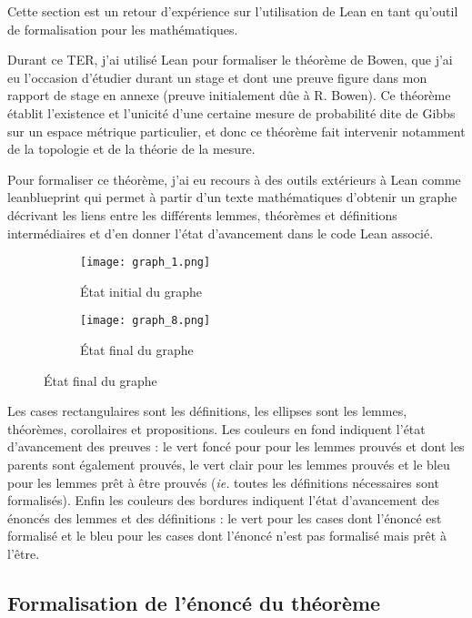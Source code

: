 \documentclass[../../rapport.tex]{subfiles}
\begin{document}
  Cette section est un retour d'expérience sur l'utilisation de Lean en tant qu'outil de formalisation pour les
  mathématiques.

  Durant ce TER, j'ai utilisé Lean pour formaliser le théorème de Bowen,
  que j'ai eu l'occasion d'étudier durant un stage et dont une preuve figure dans mon rapport de stage
  en annexe (preuve initialement dûe à R. Bowen).
  Ce théorème établit l'existence et l'unicité d'une certaine mesure de probabilité dite de Gibbs sur un espace métrique particulier,
  et donc ce théorème fait intervenir notamment de la topologie et de la théorie de la mesure.

  Pour formaliser ce théorème, j'ai eu recours à des outils extérieurs à Lean comme
  leanblueprint \cite{leanblueprint}
  qui permet à partir d'un texte mathématiques d'obtenir un graphe décrivant les liens entre les différents lemmes,
  théorèmes et définitions intermédiaires et d'en donner l'état d'avancement dans le code Lean associé.

  \begin{figure}[h]
    \centering
    \begin{subfigure}{.55\textwidth}
      \centering
      \texttt{[image: graph\_1.png]}
      \caption{État initial du graphe}
    \end{subfigure}
    \begin{subfigure}{.43\textwidth}
      \centering
      \texttt{[image: graph\_8.png]}
      \caption{État final du graphe}
    \end{subfigure}
  \end{figure}

  \begin{spacing}{0.8}
  {\scriptsize
  Les cases rectangulaires sont les définitions, les ellipses sont les lemmes, théorèmes, corollaires et propositions.
  Les couleurs en fond indiquent l'état d'avancement des preuves :
  le vert foncé pour pour les lemmes prouvés et dont les parents sont également prouvés,
  le vert clair pour les lemmes prouvés
  et le bleu pour les lemmes prêt à être prouvés (\textit{ie.} toutes les définitions nécessaires sont formalisés).
  Enfin les couleurs des bordures indiquent l'état d'avancement des énoncés des lemmes et des définitions :
  le vert pour les cases dont l'énoncé est formalisé
  et le bleu pour les cases dont l'énoncé n'est pas formalisé mais prêt à l'être.}
  \end{spacing}

  \subsection{Formalisation de l'énoncé du théorème}
\end{document}

